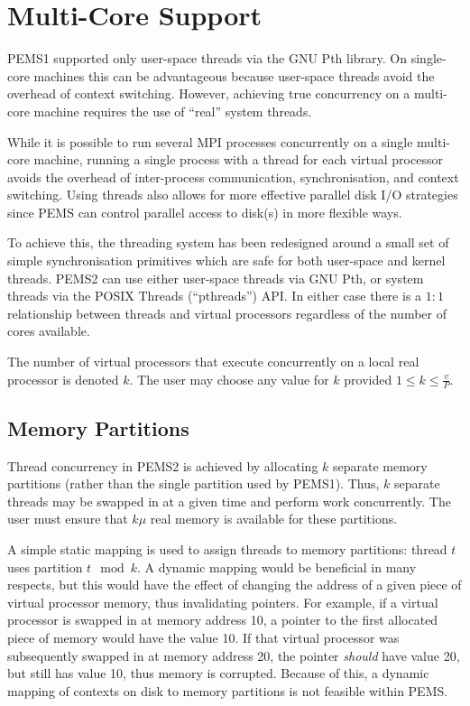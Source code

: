 \documentclass[12pt]{carletoncsthesis}
\begin{document}
\chapter{Multi-Core Support}
\thispagestyle{empty}
\label{multicore}


PEMS1 supported only user-space threads via the GNU Pth library.  On single-core
machines this can be advantageous because user-space threads avoid the
overhead of context switching.  However, achieving true concurrency on a
multi-core machine requires the use of ``real'' system threads.

While it is possible to run several MPI processes concurrently on a single
multi-core machine, running a single process with a thread for each virtual
processor avoids the overhead of inter-process communication, synchronisation,
and context switching.  Using threads also allows for more effective parallel
disk I/O strategies since PEMS can control parallel access to disk(s) in
more flexible ways.

To achieve this, the threading system has been redesigned around a small
set of simple synchronisation primitives which are safe for both user-space
and kernel threads.  PEMS2 can use either user-space threads via GNU Pth,
or system threads via the POSIX Threads (``pthreads'') API.  In either
case there is a $1:1$ relationship between threads and virtual processors
regardless of the number of cores available.

The number of virtual processors that execute concurrently on a local real
processor is denoted $k$.  The user may choose any value for $k$ provided
$1 \le k \le \frac{v}{P}$.

\section{Memory Partitions}
\label{partitions}


Thread concurrency in PEMS2 is achieved by allocating $k$ separate memory
partitions (rather than the single partition used by PEMS1).  Thus,
$k$ separate threads may be swapped in at a given time and perform work
concurrently.  The user must ensure that $k\mu$ real memory is available
for these partitions.

A simple static mapping is used to assign threads to memory partitions:
thread $t$ uses partition $t\mod{k}$.  A dynamic mapping would be beneficial
in many respects, but this would have the effect of changing the address
of a given piece of virtual processor memory, thus invalidating pointers.
For example, if a virtual processor is swapped in at memory address 10,
a pointer to the first allocated piece of memory would have the value 10.
If that virtual processor was subsequently swapped in at memory address 20,
the pointer {\em should} have value 20, but still has value 10, thus memory
is corrupted.  Because of this, a dynamic mapping of contexts on disk to
memory partitions is not feasible within PEMS.
\end{document}
